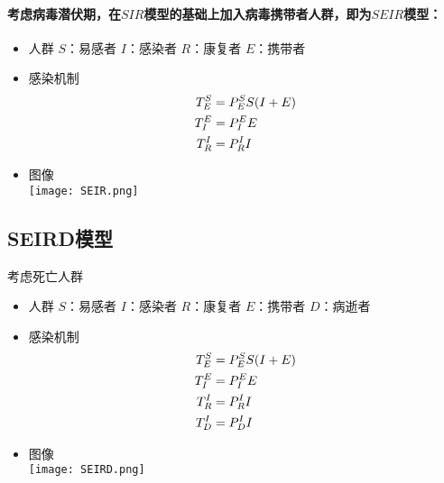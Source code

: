 \paragraph{考虑病毒潜伏期，在$SIR$模型的基础上加入病毒携带者人群，即为$SEIR$模型：}
\begin{itemize}
    \item 人群
          \subitem $S$：易感者
          \subitem $I$：感染者
          \subitem $R$：康复者
          \subitem $E$：携带者
    \item 感染机制
          \subitem
          \begin{align}
              T^{S}_{E}&=P^{S}_{E}S(I+E) \\
              T^{E}_{I}&=P^{E}_{I}E      \\
              T^{I}_{R}&=P^{I}_{R}I
          \end{align}
    \item 图像
          \\
          \texttt{[image: SEIR.png]}
\end{itemize}
\subsection{SEIRD模型}
考虑死亡人群
\begin{itemize}
    \item 人群
          \subitem $S$：易感者
          \subitem $I$：感染者
          \subitem $R$：康复者
          \subitem $E$：携带者
          \subitem $D$：病逝者
    \item 感染机制
          \subitem
          \begin{align}
              T^{S}_{E}&=P^{S}_{E}S(I+E) \\
              T^{E}_{I}&=P^{E}_{I}E      \\
              T^{I}_{R}&=P^{I}_{R}I      \\
              T^{I}_{D}&=P^{I}_{D}I
          \end{align}
    \item 图像
          \\
          \texttt{[image: SEIRD.png]}
\end{itemize}
